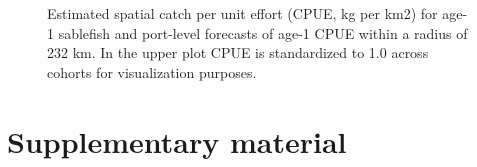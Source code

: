 \documentclass[
]{article}
\begin{document}
\clearpage

\newpage

\begin{figure}


\caption{\label{fig-bycatch-risk}Estimated spatial catch per unit effort
(CPUE, kg per km2) for age-1 sablefish and port-level forecasts of age-1
CPUE within a radius of 232 km. In the upper plot CPUE is standardized
to 1.0 across cohorts for visualization purposes.}

\end{figure}%

\break
\clearpage

\section{Supplementary material}\label{supplementary-material}
\end{document}
